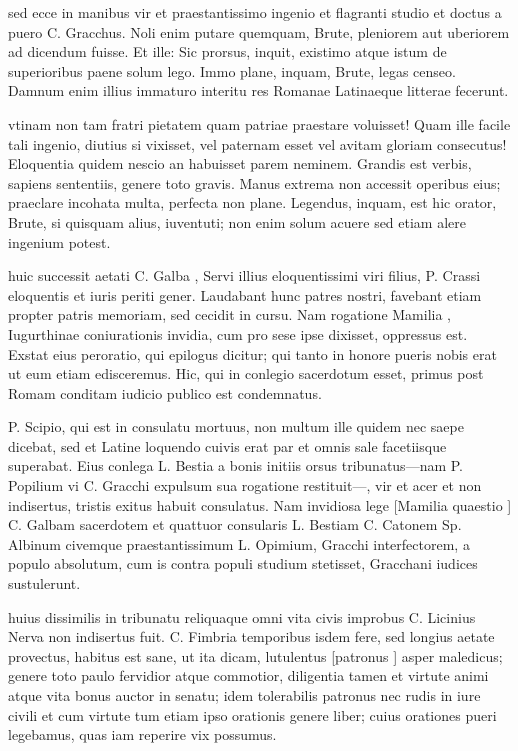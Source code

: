  sed ecce in manibus vir et praestantissimo ingenio et flagranti studio et doctus a puero C. Gracchus. Noli enim putare quemquam, Brute, pleniorem aut uberiorem ad dicendum fuisse. Et ille: Sic prorsus, inquit, existimo atque istum de superioribus paene solum lego. Immo plane, inquam, Brute, legas censeo. Damnum enim illius immaturo interitu res Romanae Latinaeque litterae fecerunt.

 vtinam non tam fratri pietatem quam patriae praestare voluisset! Quam ille facile tali ingenio, diutius si vixisset, vel paternam esset vel avitam gloriam consecutus! Eloquentia quidem nescio an habuisset parem neminem. Grandis est verbis, sapiens sententiis, genere toto gravis. Manus extrema non accessit operibus eius; praeclare incohata multa, perfecta non plane. Legendus, inquam, est hic orator, Brute, si quisquam alius, iuventuti; non enim solum acuere sed etiam alere ingenium potest.

 huic successit aetati C. Galba , Servi illius eloquentissimi viri filius, P. Crassi eloquentis et iuris periti gener. Laudabant hunc patres nostri, favebant etiam propter patris memoriam, sed cecidit in cursu. Nam rogatione Mamilia , Iugurthinae coniurationis invidia, cum pro sese ipse dixisset, oppressus est. Exstat eius peroratio, qui epilogus dicitur; qui tanto in honore pueris nobis erat ut eum etiam edisceremus. Hic, qui in conlegio sacerdotum esset, primus post Romam conditam iudicio publico est condemnatus.

 P. Scipio, qui est in consulatu mortuus, non multum ille quidem nec saepe dicebat, sed et Latine loquendo cuivis erat par et omnis sale facetiisque superabat. Eius conlega L. Bestia a bonis initiis orsus tribunatus—nam P. Popilium vi C. Gracchi expulsum sua rogatione restituit—, vir et acer et non indisertus, tristis exitus habuit consulatus. Nam invidiosa lege [Mamilia quaestio ] C. Galbam sacerdotem et quattuor consularis L. Bestiam C. Catonem Sp. Albinum civemque praestantissimum L. Opimium, Gracchi interfectorem, a populo absolutum, cum is contra populi studium stetisset, Gracchani iudices sustulerunt.

 huius dissimilis in tribunatu reliquaque omni vita civis improbus C. Licinius Nerva non indisertus fuit. C. Fimbria temporibus isdem fere, sed longius aetate provectus, habitus est sane, ut ita dicam, lutulentus [patronus ] asper maledicus; genere toto paulo fervidior atque commotior, diligentia tamen et virtute animi atque vita bonus auctor in senatu; idem tolerabilis patronus nec rudis in iure civili et cum virtute tum etiam ipso orationis genere liber; cuius orationes pueri legebamus, quas iam reperire vix possumus.

